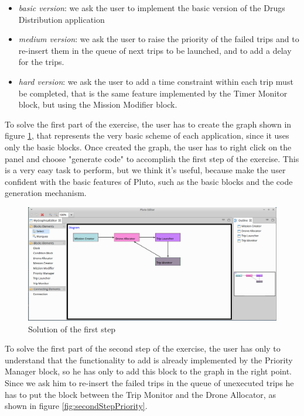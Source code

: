 \begin{itemize}
\itemsep2pt
\item{
\textit{basic version}: we ask the user to implement the basic version of the Drugs Distribution application
}
\item{
\textit{medium version}: we ask the user to raise the priority of the failed trips and to re-insert them in the queue of next trips to be launched, and to add a delay for the trips.
}
\item{
\textit{hard version}: we ask the user to add a time constraint within each trip must be completed, that is the same feature implemented by the Timer Monitor block, but using the Mission Modifier block.
}
\end{itemize}

To solve the first part of the exercise, the user has to create the graph shown in figure \ref{fig:firstStep}, that represents the very basic scheme of each application, since it uses only the basic blocks.
Once created the graph, the user has to right click on the panel and choose "generate code" to accomplish the first step of the exercise.
This is a very easy task to perform, but we think it's useful, because make the user confident with the basic features of Pluto, such as the basic blocks and the code generation mechanism.


\begin{figure}[htb]
  \centering
  \includegraphics[width=\linewidth]{pictures/EditorScreen.png}
  \caption{Solution of the first step}
  \label{fig:firstStep}
\end{figure}

\newpage

To solve the first part of the second step of the exercise, the user has only to understand that the functionality to add is already implemented by the Priority Manager block, so he has only to add this block to the graph in the right point.
Since we ask him to re-insert the failed trips in the queue of unexecuted trips he has to put the block between the Trip Monitor and the Drone Allocator, as shown in figure \ref{fig:secondStepPriority}.

